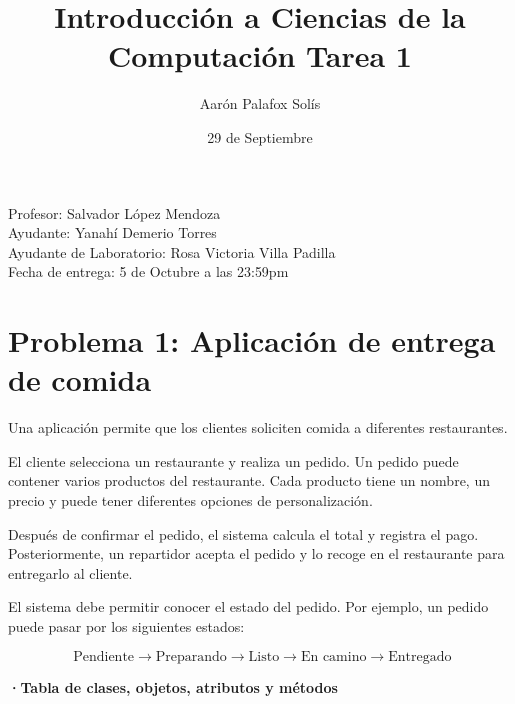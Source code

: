 \documentclass[12pt]{article}
\title{Introducción a Ciencias de la Computación Tarea 1}
\author{Aarón Palafox Solís}
\date{29 de Septiembre}
\begin{document}

  \maketitle
\begin{center}
     {\large Profesor: Salvador López Mendoza \\[0.15cm]
     Ayudante: Yanahí Demerio Torres \\[0.15cm]
     Ayudante de Laboratorio: Rosa Victoria Villa Padilla} \\[0.8cm]

     {\large Fecha de entrega: 5 de Octubre a las 23:59pm}
\end{center}

\vspace{1cm}

\section*{Problema 1: Aplicación de entrega de comida}
Una aplicación permite que los clientes soliciten comida a diferentes restaurantes.

El cliente selecciona un restaurante y realiza un pedido. Un pedido puede contener varios productos del restaurante. Cada producto tiene un nombre, un precio y puede tener diferentes opciones de personalización.

Después de confirmar el pedido, el sistema calcula el total y registra el pago. Posteriormente, un repartidor acepta el pedido y lo recoge en el restaurante para entregarlo al cliente.

El sistema debe permitir conocer el estado del pedido. Por ejemplo, un pedido puede pasar por los siguientes estados:

\[ \text{ Pendiente} \rightarrow \text{Preparando} \rightarrow \text{Listo} \rightarrow \text{En camino} \rightarrow \text{Entregado}
\]

\textbf{·Tabla de clases, objetos, atributos y métodos}
\end{document}
